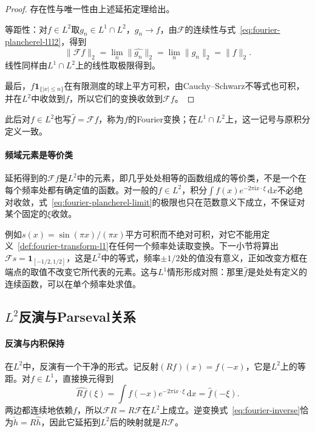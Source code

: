 \begin{proof}
存在性与唯一性由上述延拓定理给出。

等距性：对$f\in L^2$取$g_n\in L^1\cap L^2$，$g_n\to f$，由$\mathcal F$的连续性与式~\eqref{eq:fourier-plancherel-l1l2}，得到
\[
\lVert\mathcal Ff\rVert_2=\lim_n\lVert\widehat{g_n}\rVert_2=\lim_n\lVert g_n\rVert_2=\lVert f\rVert_2.
\]
线性同样由$L^1\cap L^2$上的线性取极限得到。

最后，$f\mathbf 1_{\{\lvert x\rvert\leq n\}}$在有限测度的球上平方可积，由Cauchy--Schwarz不等式也可积，并在$L^2$中收敛到$f$，所以它们的变换收敛到$\mathcal Ff$。
\end{proof}

此后对$f\in L^2$也写$\widehat f=\mathcal Ff$，称为$f$的Fourier变换；在$L^1\cap L^2$上，这一记号与原积分定义一致。

\paragraph{频域元素是等价类}

延拓得到的$\mathcal Ff$是$L^2$中的元素，即几乎处处相等的函数组成的等价类，不是一个在每个频率处都有确定值的函数。对一般的$f\in L^2$，积分$\int f(x)e^{-2\pi\mathrm ix\cdot\xi}\,\mathrm dx$不必绝对收敛，式~\eqref{eq:fourier-plancherel-limit}的极限也只在范数意义下成立，不保证对某个固定的$\xi$收敛。

例如$s(x)=\sin(\pi x)/(\pi x)$平方可积而不绝对可积，对它不能用定义~\ref{def:fourier-transform-l1}在任何一个频率处读取变换。下一小节将算出$\mathcal Fs=\mathbf 1_{[-1/2,1/2]}$，这是$L^2$中的等式，频率$\pm1/2$处的值没有意义，正如改变方框在端点的取值不改变它所代表的元素。这与$L^1$情形形成对照：那里$\widehat f$是处处有定义的连续函数，可以在单个频率处求值。

\subsection{\texorpdfstring{$L^2$}{L2}反演与Parseval关系}
\label{sec:fourier-l2-inversion}

\paragraph{反演与内积保持}

在$L^2$中，反演有一个干净的形式。记反射$(Rf)(x)=f(-x)$，它是$L^2$上的等距。对$f\in L^1$，直接换元得到
\[
\widehat{Rf}(\xi)=\int f(-x)e^{-2\pi\mathrm ix\cdot\xi}\,\mathrm dx=\widehat f(-\xi).
\]
两边都连续地依赖$f$，所以$\mathcal FR=R\mathcal F$在$L^2$上成立。逆变换式~\eqref{eq:fourier-inverse}恰为$\check h=R\widehat h$，因此它延拓到$L^2$后的映射就是$R\mathcal F$。

